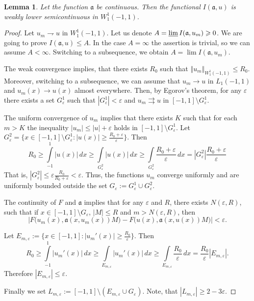 \documentclass[12pt]{article}
\newcommand{\norm}[1]{\left\Vert#1\right\Vert}
\newcommand{\abs}[1]{\left\vert#1\right\vert}
\newcommand{\eps}{\varepsilon}
\renewcommand{\ge}{\geqslant}
\renewcommand{\le}{\leqslant}
\newtheorem{lm}{Lemma}
\newcommand{\W}{W_1^1}
\begin{document}
\begin{lm}
Let the function $\mathfrak a$ be continuous. Then the functional $I(\mathfrak a, u)$ is weakly lower semicontinuous in $\W(-1, 1)$.
\label{lowersemi}
\end{lm}

\begin{proof}
Let $u_m \rightharpoondown u$ in $\W(-1, 1)$.
Let us denote $A = \varliminf I( \mathfrak a, u_m ) \ge 0$.
We are going to prove $I(\mathfrak a, u) \le A$.
In the case $A = \infty$ the assertion is trivial, so we can assume $A < \infty$.
Switching to a subsequence, we obtain $A = \lim I( \mathfrak a, u_m )$.

The weak convergence implies, that there exists
$R_0$ such that $\norm{ u_m }_{\W(-1, 1)} \le R_0$.
Moreover, switching to a subsequence, we can assume that $u_m \to u$ in $L_1(-1, 1)$
and $u_m(x) \to u(x)$ almost everywhere.
Then, by Egorov's theorem, for any $\eps$ there exists a set
$G_\eps^1$ such that $\abs{ G_\eps^1 } < \eps$ and $u_m \rightrightarrows u$ in $[-1, 1] \setminus G_\eps^1$.

The uniform convergence of $u_m$ implies that there exists $K$ such that for each $m>K$
the inequality $\abs{u_m} \le \abs{u} + \eps$ holds in $[-1, 1] \setminus G_\eps^1$.
Let $G_\eps^2 = \{x \in [-1, 1] \setminus G_\eps^1 : \abs{u(x)} \ge \frac{R_0 + \eps}{\eps} \}$.
Then
$$R_0 \ge \int\limits_{-1}^1 \abs{ u(x) } \, dx \ge \int\limits_{G_\eps^2} \abs{ u(x) } \, dx \ge
\int\limits_{G_\eps^2} \frac{R_0 + \eps}{\eps} \, dx = \abs{G_\eps^2} \frac{R_0 + \eps}{\eps}$$
That is, $\abs{G_\eps^2} \le \eps \frac{R_0}{R_0 + \eps} < \eps$.
Thus, the functions $u_m$ converge uniformly and are uniformly bounded outside the set $G_\eps := G_\eps^1 \cup G_\eps^2$.

The continuity of $F$ and $\mathfrak a$ implies that for any $\eps$ and $R$, there exists
$N( \eps, R )$, such that if $x \in [-1, 1] \setminus G_\eps$, $\abs{ M } \le R$ and $m > N( \eps, R )$, then
$$| F\big( u_m( x ), \mathfrak a( x, u_m( x ) ) M \big) - F\big( u( x ), \mathfrak a( x, u( x ) ) M \big) | < \eps.$$

Let $E_{m,\eps} := \{ x \in [-1, 1]: \abs{ u_m'( x ) } \ge \frac{ R_0 }{ \eps } \}$.
Then
$$R_0 \ge \int\limits_{-1}^1 \abs{ u_m'( x ) } \, dx \ge \int\limits_{ E_{m,\eps} } \abs{ u_m'( x ) } \, dx \ge
\int\limits_{ E_{m,\eps} } \frac{ R_0 }{ \eps } \, dx = \frac{ R_0 }{ \eps } \abs{ E_{m,\eps} }.$$
Therefore $\abs{ E_{m,\eps} } \le \eps$.

Finally we set $L_{m,\eps} := [-1, 1] \setminus ( E_{m,\eps} \cup G_\eps )$.
Note, that $\abs{ L_{m,\eps} } \ge 2 - 3 \eps$.


\end{proof}
\end{document}
